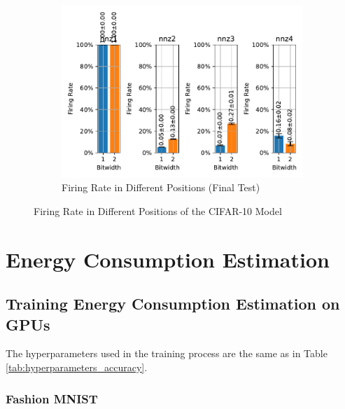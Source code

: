         \begin{figure}[H]
            \centering
            \ContinuedFloat
            \begin{subfigure}[H]{\textwidth}
                \centering
                \includegraphics[width=\textwidth]{../firerate/CIFAR10/plots/cifar10_final_firerate.pdf}
                \caption{Firing Rate in Different Positions (Final Test)}
            \end{subfigure}
            \caption{Firing Rate in Different Positions of the CIFAR-10 Model}
        \end{figure}

\chapter{Energy Consumption Estimation}
\label{appendix:energy}

\section{Training Energy Consumption Estimation on GPUs}
\label{appendix:energy_gpu}

    The hyperparameters used in the training process are the same as in Table \ref{tab:hyperparameters_accuracy}.

    \subsection{Fashion MNIST}
    \label{appendix:energy_gpu_fashion_mnist}

